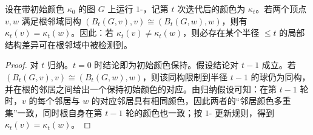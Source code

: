 \begin{lemma}\label{lem:wl-locality}
设在带初始颜色 $\kappa_0$ 的图 $G$ 上运行 $1$-\WL{}，记第 $t$ 次迭代后的颜色为 $\kappa_t$。若两个顶点 $v,w$ 满足根邻域同构 $(B_t(G,v),v)\cong(B_t(G,w),w)$，则有 $\kappa_t(v)=\kappa_t(w)$。因此：若 $\kappa_t(v)\ne \kappa_t(w)$，则必存在某个半径 $\le t$ 的局部结构差异可在根邻域中被检测到。
\end{lemma}

\begin{proof}
对 $t$ 归纳。$t=0$ 时结论即为初始颜色保持。假设结论对 $t-1$ 成立。若 $(B_t(G,v),v)\cong(B_t(G,w),w)$，则该同构限制到半径 $t-1$ 的球仍为同构，并在根的邻居之间给出一个保持初始颜色的对应。由归纳假设可知：在第 $t-1$ 轮时，$v$ 的每个邻居与 $w$ 的对应邻居具有相同颜色，因此两者的“邻居颜色多重集”一致，同时根自身在第 $t-1$ 轮的颜色也一致；按 $1$-\WL{} 更新规则，得到 $\kappa_t(v)=\kappa_t(w)$。
\end{proof}

